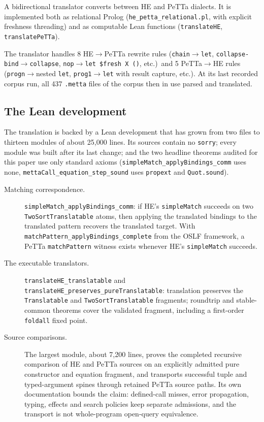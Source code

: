 \documentclass[11pt]{article}
\newcommand{\code}[1]{\texttt{#1}}
\newcommand{\PeTTa}{\textup{PeTTa}}
\newcommand{\HE}{\textup{HE}}
\begin{document}
A bidirectional translator converts between \HE{} and \PeTTa{} dialects.
It is implemented both as relational Prolog
(\code{he\_petta\_relational.pl}, with explicit freshness threading) and
as computable Lean functions (\code{translateHE}, \code{translatePeTTa}).

The translator handles 8 \HE{}$\to$\PeTTa{} rewrite rules
(\code{chain}$\to$\code{let}, \code{collapse-bind}$\to$\code{collapse},
\code{nop}$\to$\code{let~\$fresh~X~()}, etc.)\ and 5
\PeTTa{}$\to$\HE{} rules (\code{progn}$\to$nested \code{let},
\code{prog1}$\to$\code{let} with result capture, etc.).  At its last recorded
corpus run, all 437 \code{.metta} files of the corpus then in use parsed and
translated.

\subsection{The Lean development}

The translation is backed by a Lean development that has grown from two
files to thirteen modules of about 25{,}000 lines.  Its sources
contain no \code{sorry}; every module was built after its last change; and the
two headline theorems audited for this paper use only standard axioms
(\code{simpleMatch\_applyBindings\_comm} uses none,
\code{mettaCall\_equation\_step\_sound} uses \code{propext} and
\code{Quot.sound}).

\begin{description}
\item[Matching correspondence.]
  \code{simpleMatch\_applyBindings\_comm}: if \HE{}'s \code{simpleMatch}
  succeeds on two \code{TwoSortTranslatable} atoms, then applying the
  translated bindings to the translated pattern recovers the translated
  target.  With \code{matchPattern\_applyBindings\_complete} from the OSLF
  framework, a \PeTTa{} \code{matchPattern} witness exists whenever \HE{}'s
  \code{simpleMatch} succeeds.
\item[The executable translators.]
  \code{translateHE\_translatable} and
  \code{translateHE\_preserves\_pureTranslatable}: translation preserves the
  \code{Translatable} and \code{TwoSortTranslatable} fragments; roundtrip and
  stable-common theorems cover the validated fragment, including a
  first-order \code{foldall} fixed point.
\item[Source comparisons.]
  The largest module, about 7{,}200 lines, proves the completed recursive
  comparison of \HE{} and \PeTTa{} sources on an explicitly admitted pure
  constructor and equation fragment, and transports successful tuple and
  typed-argument spines through retained \PeTTa{} source paths.  Its own
  documentation bounds the claim: defined-call misses, error propagation,
  typing, effects and search policies keep separate admissions, and the
  transport is not whole-program open-query equivalence.
\end{description}
\end{document}
